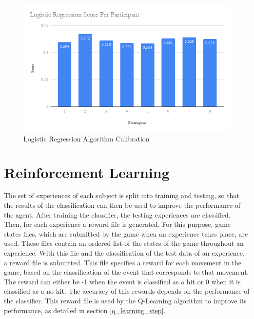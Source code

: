 \documentclass[journal]{IEEEtran}
\begin{document}
\begin{figure}[h]
    \centering
    \includegraphics[scale=0.4]{Images/algorithm_calibration/LR_calib.png}
    \caption{Logistic Regression Algorithm Calibration}
    \label{diag:algorithm_calibration:lr}
\end{figure}

\section{Reinforcement Learning}

The set of experiences of each subject is split into training and testing, so that the results of the classification can then be used to improve the performance of the agent. After training the classifier, the testing experiences are classified. Then, for each experience a reward file is generated. For this purpose, game states files, which are submitted by the game when an experience takes place, are used. These files contain an ordered list of the states of the game throughout an experience. With this file and the classification of the test data of an experience, a reward file is submitted. This file specifies a reward for each movement in the game, based on the classification of the event that corresponds to that movement. The reward can either be -1 when the event is classified as a hit or 0 when it is classified as a no hit. The accuracy of this rewards depends on the performance of the classifier. This reward file is used by the Q-Learning algorithm to improve its performance, as detailed in section \ref{q_learning_step}.
\end{document}
